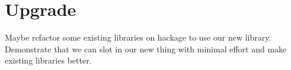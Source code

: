 \section{Upgrade}

Maybe refactor some existing libraries on hackage to use our new library. Demonstrate that we can slot in our new thing with minimal effort and make existing libraries better.

